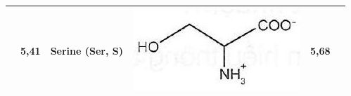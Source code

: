 \documentclass[10pt]{article}
\begin{document}
\begin{table}[h]
\begin{center}
\begin{tabular}{|l|l|l|l|l|l|}
 & 5,41 & Serine (Ser, S) & \includegraphics[max width=\textwidth]{2025_10_23_de6f5713836e4e91b3c8g-050}
 & 5,68 \\
\hline
\end{tabular}
\end{center}
\end{table}
\end{document}
